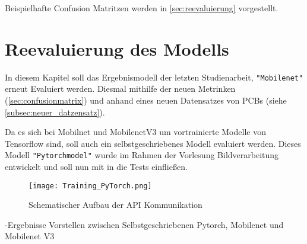 Beispielhafte Confusion Matritzen werden in \autoref{sec:reevaluierung} vorgestellt.

\section{Reevaluierung des Modells} \label{sec:reevaluierung}

In diesem Kapitel soll das Ergebnismodell der letzten Studienarbeit, \texttt{"Mobilenet"} erneut Evaluiert werden. Diesmal mithilfe der neuen Metrinken (\autoref{sec:confusionmatrix}) und anhand eines neuen Datensatzes von PCBs (siehe \autoref{subsec:neuer_datzensatz}).

Da es sich bei Mobilnet und MobilenetV3 um vortrainierte Modelle von Tensorflow sind, soll auch ein selbstgeschriebenes Modell evaluiert werden. Dieses Modell \texttt{"Pytorchmodel"} wurde im Rahmen der Vorlesung Bildverarbeitung entwickelt und soll nun mit in die Tests einfließen. 

\begin{figure}[h]
    \centering
    \texttt{[image: Training\_PyTorch.png]}
    \caption{Schematischer Aufbau der API Kommunikation}
    \label{fig:Training_PyTorch}
\end{figure}

-Ergebnisse Vorstellen zwischen Selbstgeschriebenen Pytorch, Mobilenet und Mobilenet V3